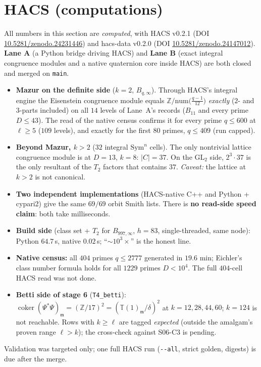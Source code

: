 \documentclass[11pt,a4paper]{article}
\newcommand{\Z}{\mathbb{Z}}
\newcommand{\T}{\mathbb{T}}
\newcommand{\GL}{\mathrm{GL}}
\newcommand{\Sym}{\mathrm{Sym}}
\newcommand{\m}{\mathfrak{m}}
\newcommand{\coker}{\operatorname{coker}}
\begin{document}
\section*{HACS (computations)}

All numbers in this section are \emph{computed}, with HACS v0.2.1
(DOI \href{https://doi.org/10.5281/zenodo.24231446}{10.5281/zenodo.24231446}) and hacs-data v0.2.0
(DOI \href{https://doi.org/10.5281/zenodo.24147012}{10.5281/zenodo.24147012}). \textbf{Lane A} (a Python bridge
driving HACS) and \textbf{Lane B} (exact integral congruence modules and a native quaternion core inside HACS) are both
closed and merged on \texttt{main}.
\begin{itemize}
  \item \textbf{Mazur on the definite side} ($k=2$, $B_{q,\infty}$). Through HACS's integral engine the Eisenstein
        congruence module equals $\Z/\mathrm{num}\bigl(\tfrac{q-1}{12}\bigr)$ \emph{exactly} ($2$- and $3$-parts
        included) on all $14$ levels of Lane~A's records ($B_{11}$ and every prime $D\le43$). The read of the native
        census confirms it for every prime $q\le600$ at $\ell\ge5$ ($109$ levels), and exactly for the first $80$ primes,
        $q\le409$ (run capped).
  \item \textbf{Beyond Mazur, $k>2$} ($32$ integral $\Sym^n$ cells). The only nontrivial lattice congruence module is at
        $D=13$, $k=8$: $|C|=37$. On the $\GL_2$ side, $2^3\cdot37$ is the only resultant of the $T_2$ factors that
        contains $37$. \emph{Caveat:} the lattice at $k>2$ is not canonical.
  \item \textbf{Two independent implementations} (HACS-native C++ and Python + cypari2) give the same $69/69$ orbit Smith
        lists. There is \textbf{no read-side speed claim}: both take milliseconds.
  \item \textbf{Build side} (class set + $T_2$ for $B_{997,\infty}$, $h=83$, single-threaded, same node): Python
        $64.7$\,s, native $0.02$\,s; ``${\sim}10^3\times$'' is the honest line.
  \item \textbf{Native census:} all $404$ primes $q\le2777$ generated in $19.6$ min; Eichler's class number formula holds
        for all $1229$ primes $D<10^4$. The full $404$-cell HACS read was not done.
  \item \textbf{Betti side of stage 6} (\texttt{T4\_betti}): $\coker(\Psi^*\Psi)_\m=(\Z/17)^2=(\T(1)_\m/\delta)^2$ at
        $k=12,28,44,60$; $k=124$ is not reachable. Rows with $k\ge\ell$ are tagged \emph{expected} (outside the
        amalgam's proven range $\ell>k$); the cross-check against S06-C3 is pending.
\end{itemize}
Validation was targeted only; one full HACS run (\texttt{-{}-all}, strict golden, digests) is due after the merge.
\end{document}
